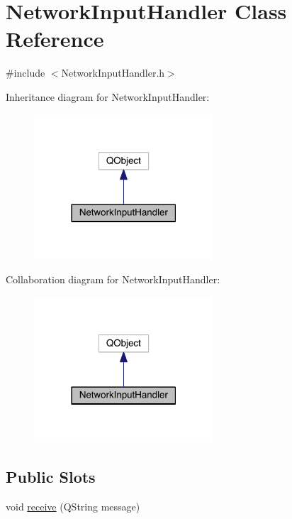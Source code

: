\hypertarget{class_network_input_handler}{\section{Network\+Input\+Handler Class Reference}
\label{class_network_input_handler}
}


{\ttfamily \#include $<$Network\+Input\+Handler.\+h$>$}



Inheritance diagram for Network\+Input\+Handler\+:\nopagebreak
\begin{figure}[H]
\begin{center}
\leavevmode
\includegraphics[width=190pt]{class_network_input_handler__inherit__graph}
\end{center}
\end{figure}


Collaboration diagram for Network\+Input\+Handler\+:\nopagebreak
\begin{figure}[H]
\begin{center}
\leavevmode
\includegraphics[width=190pt]{class_network_input_handler__coll__graph}
\end{center}
\end{figure}
\subsection*{Public Slots}
\begin{DoxyCompactItemize}
\item 
void \hyperlink{class_network_input_handler_a0b53f9df078c3be3ba2bae1b324fa810}{receive} (Q\+String message)
\end{DoxyCompactItemize}
